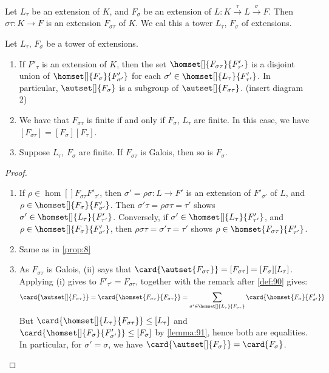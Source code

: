 \begin{definition}
  \label{def:92}
  Let $L_\tau$ be an extension of $K$, and $F_\sigma$ be an extension of $L : K \stackrel{\tau}{\rightarrow} L \stackrel{\sigma}{\rightarrow} F$. Then $\sigma\tau : K \rightarrow F$ is an extension $F_{\sigma\tau}$ of $K$. We cal this a tower $L_\tau$, $F_\sigma$ of extensions.
\end{definition}

\begin{proposition}
  \label{prop:93}
  Let $L_\tau$, $F_\sigma$ be a tower of extensions.
  \begin{enumerate}
  \item If $F'_\tau$ is an extension of $K$, then the set $\homset[]{F_{\sigma\tau}}{F'_{\tau'}}$ is a disjoint union of $\homset[]{F_\sigma}{F'_{\sigma'}}$ for each $\sigma' \in \homset[]{L_\tau}{F'_{\tau'}}$. In particular, $\autset[]{F_\sigma}$ is a subgroup of $\autset[]{F_{\sigma\tau}}$.
      (insert diagram 2)
  \item We have that $F_{\sigma\tau}$ is finite if and only if $F_\sigma$, $L_\tau$ are finite. In this case, we have $[F_{\sigma\tau}] = [F_\sigma][F_\tau]$.
  \item Suppose $L_\tau$, $F_\sigma$ are finite. If $F_{\sigma\tau}$ is Galois, then so is $F_\sigma$.
  \end{enumerate}
\end{proposition}

\begin{proof}
  \begin{enumerate}
  \item If $\rho \in \hom[]{F_{\sigma\tau}}{F'_{\tau'}}$, then $\sigma' = \rho\sigma : L \rightarrow F'$ is an extension of $F'_{\sigma'}$ of $L$, and $\rho \in \homset[]{F_\sigma}{F'_{\sigma'}}$. Then $\sigma'\tau = \rho\sigma\tau = \tau'$ shows $\sigma' \in \homset[]{L_\tau}{F'_{\tau'}}$. Conversely, if $\sigma' \in \homset[]{L_\tau}{F'_{\tau'}}$, and $\rho \in \homset[]{F_\sigma}{F'_{\sigma'}}$, then $\rho\sigma\tau = \sigma'\tau = \tau'$ shows $\rho \in \homset{F_{\sigma\tau}}{F'_{\tau'}}$.
  \item Same as in \autoref{prop:8}
  \item As $F_{\sigma\tau}$ is Galois, (ii) says that $\card{\autset{F_{\sigma\tau}}} = [F_{\sigma\tau}] = [F_\sigma][L_\tau]$. Applying (i) gives to $F'_{\tau'} = F_{\sigma\tau}$, together with the remark after \autoref{def:90} gives:
\[
\card{\autset[]{F_{\sigma\tau}}} = \card{\homset{F_{\sigma\tau}}{F_{\sigma\tau}}} = \sum_{\sigma' \in \homset[]{L_\tau}{F_{\sigma\tau}}} \card{\homset{F_\sigma}{F'_{\sigma'}}}
\]
But $\card{\homset[]{L_\tau}{F_{\sigma\tau}}} \leq [L_\tau]$ and $\card{\homset[]{F_\sigma}{F'_{\sigma'}}} \leq [F_\sigma]$ by \autoref{lemma:91}, hence both are equalities. In particular, for $\sigma' = \sigma$, we have $\card{\autset[]{F_\sigma}} = \card{F_\sigma}$. 
  \end{enumerate}
\end{proof}

